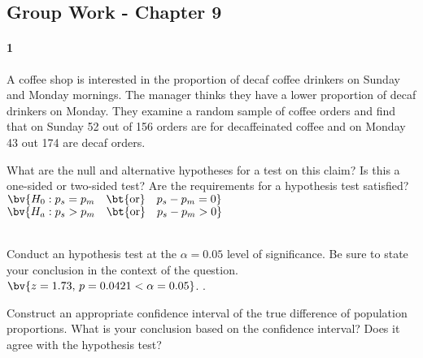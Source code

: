 \documentclass{article}
\begin{document}
\begin{flushleft}
\section*{Group Work - Chapter 9}
\paragraph{1} A coffee shop is interested in the proportion of decaf coffee drinkers on Sunday and Monday mornings. The manager thinks they have a lower proportion of decaf drinkers on Monday. They examine a random sample of coffee orders and find that on Sunday 52 out of 156 orders are for decaffeinated coffee and on Monday 43 out 174 are decaf orders.
\begin{enumalpha}
\item What are the null and alternative hypotheses for a test on this claim? Is this a one-sided or two-sided test? Are the requirements for a hypothesis test satisfied?\\
\medskip
$\bv{H_0: p_s = p_m \quad \text{\bt{or}} \quad p_s - p_m = 0}$ \\
$\bv{H_a: p_s > p_m \quad \text{\bt{or}} \quad p_s - p_m > 0}$ \\
\\
\vspace{.5in}
\item Conduct an hypothesis test at the $\alpha = 0.05$ level of significance. Be sure to state your conclusion in the context of the question.\\
\medskip
$\bv{z = 1.73, \, p = 0.0421 < \alpha = 0.05}$. .\\
\vspace{.5in}
\item Construct an appropriate confidence interval of the true difference of population proportions. What is your conclusion based on the confidence interval? Does it agree with the hypothesis test?\\
\medskip
{}\\
\end{enumalpha}




\end{flushleft}
\end{document}
